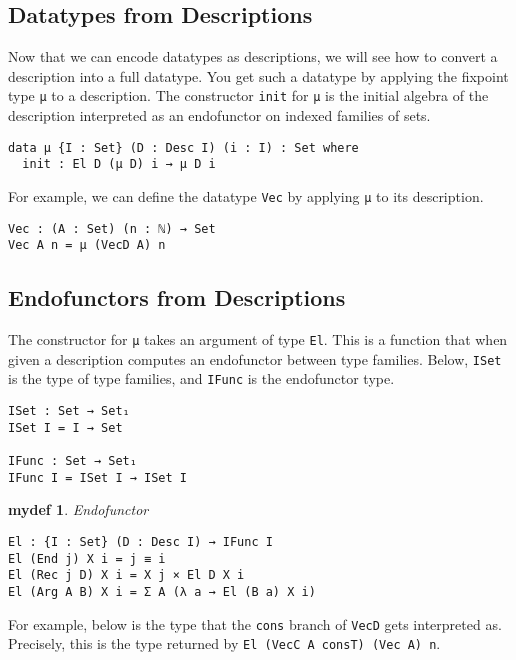 \documentclass[preprint,nonatbib]{sigplanconf}
\newtheorem{mydef}{mydef}
\begin{document}
\subsection{Datatypes from Descriptions}

Now that we can encode datatypes as descriptions, we will see how to
convert a description into a full datatype. You get such a datatype by
applying the fixpoint type {\tt μ} to a description.
The constructor {\tt init}
for {\tt μ} is the initial algebra of the description interpreted as
an endofunctor on indexed families of sets.

\begin{verbatim}
data μ {I : Set} (D : Desc I) (i : I) : Set where
  init : El D (μ D) i → μ D i
\end{verbatim}

For example, we can define the datatype {\tt Vec} by applying
{\tt μ} to its description.

\begin{verbatim}
Vec : (A : Set) (n : ℕ) → Set
Vec A n = μ (VecD A) n
\end{verbatim}

\subsection{Endofunctors from Descriptions}

The constructor for {\tt μ} takes an argument of type {\tt El}.
This is a function that when given a description computes an
endofunctor between type families. Below, {\tt ISet} is the type of
type families, and {\tt IFunc} is the endofunctor type.

\begin{verbatim}
ISet : Set → Set₁
ISet I = I → Set

IFunc : Set → Set₁
IFunc I = ISet I → ISet I
\end{verbatim}

\begin{mydef}\label{def:el}
Endofunctor

\begin{verbatim}
El : {I : Set} (D : Desc I) → IFunc I
El (End j) X i = j ≡ i
El (Rec j D) X i = X j × El D X i
El (Arg A B) X i = Σ A (λ a → El (B a) X i)
\end{verbatim}

\end{mydef}

For example, below is the type that the {\tt cons} branch of
{\tt VecD} gets interpreted as. Precisely, this is the type returned
by {\tt El (VecC A consT) (Vec A) n}.
\end{document}
